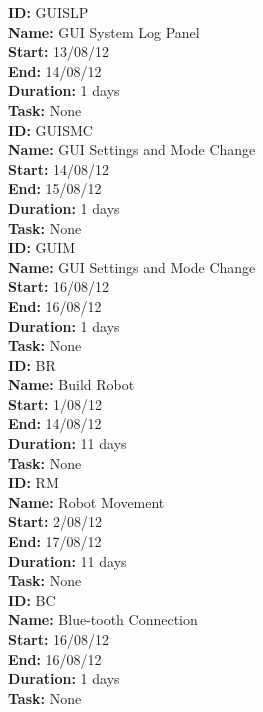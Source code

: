 \documentclass[11pt, a4paper]{report}
\begin{document}
\noindent \textbf{ID:} GUISLP \\
\noindent \textbf{Name:} GUI System Log Panel \\
\noindent \textbf{Start:} 13/08/12 \\
\noindent \textbf{End:} 14/08/12 \\
\noindent \textbf{Duration:} 1 days \\
\noindent \textbf{Task:} None\\[0.5cm]

\noindent \textbf{ID:} GUISMC \\
\noindent \textbf{Name:} GUI Settings and Mode Change \\
\noindent \textbf{Start:} 14/08/12 \\
\noindent \textbf{End:} 15/08/12 \\
\noindent \textbf{Duration:} 1 days \\
\noindent \textbf{Task:} None\\[0.5cm]

\noindent \textbf{ID:} GUIM \\
\noindent \textbf{Name:} GUI Settings and Mode Change \\
\noindent \textbf{Start:} 16/08/12 \\
\noindent \textbf{End:} 16/08/12 \\
\noindent \textbf{Duration:} 1 days \\
\noindent \textbf{Task:} None\\[0.5cm]

\noindent \textbf{ID:} BR \\
\noindent \textbf{Name:} Build Robot \\
\noindent \textbf{Start:} 1/08/12 \\
\noindent \textbf{End:} 14/08/12 \\
\noindent \textbf{Duration:} 11 days \\
\noindent \textbf{Task:} None\\[0.5cm]

\noindent \textbf{ID:} RM \\
\noindent \textbf{Name:} Robot Movement \\
\noindent \textbf{Start:} 2/08/12 \\
\noindent \textbf{End:} 17/08/12 \\
\noindent \textbf{Duration:} 11 days \\
\noindent \textbf{Task:} None\\[0.5cm]

\noindent \textbf{ID:} BC \\
\noindent \textbf{Name:} Blue-tooth Connection \\
\noindent \textbf{Start:} 16/08/12 \\
\noindent \textbf{End:} 16/08/12 \\
\noindent \textbf{Duration:} 1 days \\
\noindent \textbf{Task:} None\\[0.5cm]
\end{document}
